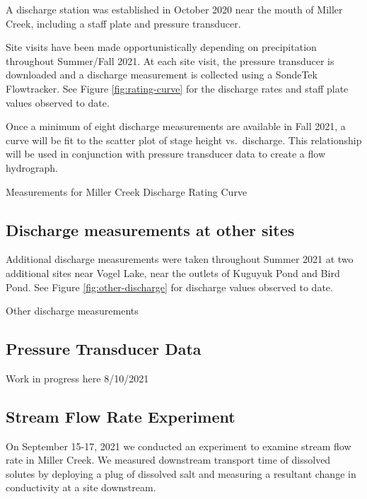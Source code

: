\documentclass[
]{book}
\begin{document}
A discharge station was established in October 2020 near the mouth of Miller Creek, including a staff plate and pressure transducer.

Site visits have been made opportunistically depending on precipitation throughout Summer/Fall 2021. At each site visit, the pressure transducer is downloaded and a discharge measurement is collected using a SondeTek Flowtracker. See Figure \ref{fig:rating-curve} for the discharge rates and staff plate values observed to date.

Once a minimum of eight discharge measurements are available in Fall 2021, a curve will be fit to the scatter plot of stage height vs.~discharge. This relationship will be used in conjunction with pressure transducer data to create a flow hydrograph.

\label{fig:rating-curve}Measurements for Miller Creek Discharge Rating Curve

\hypertarget{discharge-measurements-at-other-sites}{%
\subsection{Discharge measurements at other sites}\label{discharge-measurements-at-other-sites}}

Additional discharge measurements were taken throughout Summer 2021 at two additional sites near Vogel Lake, near the outlets of Kuguyuk Pond and Bird Pond. See Figure \ref{fig:other-discharge} for discharge values observed to date.

\label{fig:other-discharge}Other discharge measurements

\hypertarget{pressure-transducer-data}{%
\subsection{Pressure Transducer Data}\label{pressure-transducer-data}}

Work in progress here 8/10/2021

\hypertarget{stream-flow-rate-experiment}{%
\subsection{Stream Flow Rate Experiment}\label{stream-flow-rate-experiment}}

On September 15-17, 2021 we conducted an experiment to examine stream flow rate in Miller Creek. We measured downstream transport time of dissolved solutes by deploying a plug of dissolved salt and measuring a resultant change in conductivity at a site downstream.
\end{document}
